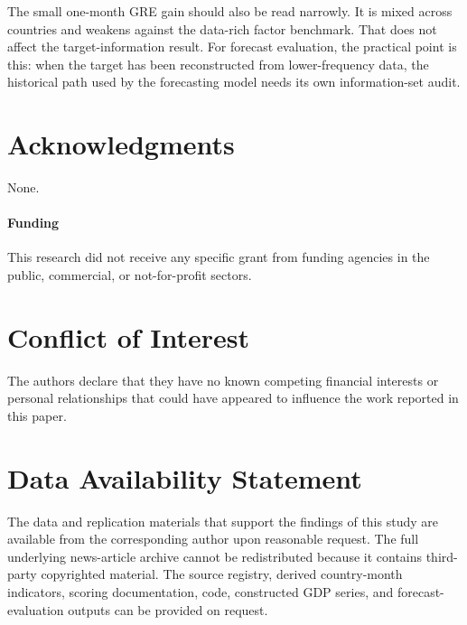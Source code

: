 \documentclass[preprint,12pt,authoryear]{elsarticle}
\begin{document}
The small one-month GRE gain should also be read narrowly. It is mixed across countries and weakens against the data-rich factor benchmark. That does not affect the target-information result. For forecast evaluation, the practical point is this: when the target has been reconstructed from lower-frequency data, the historical path used by the forecasting model needs its own information-set audit.
\section*{Acknowledgments}
None.

\paragraph{Funding} This research did not receive any specific grant from funding agencies in the public, commercial, or not-for-profit sectors.

\section*{Conflict of Interest}
The authors declare that they have no known competing financial interests or personal relationships that could have appeared to influence the work reported in this paper.

\section*{Data Availability Statement}
The data and replication materials that support the findings of this study are available from the corresponding author upon reasonable request. The full underlying news-article archive cannot be redistributed because it contains third-party copyrighted material. The source registry, derived country-month indicators, scoring documentation, code, constructed GDP series, and forecast-evaluation outputs can be provided on request.
\end{document}
